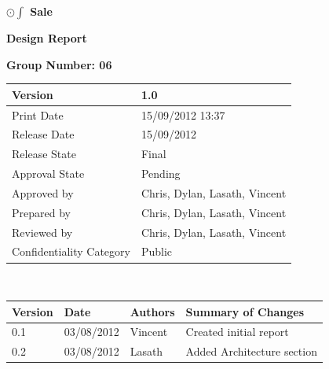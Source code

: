 \documentclass[a4paper]{article}
\begin{document}
\thispagestyle{empty}      %
\begin{center}
\Large\textbf{$\odot\int$ Sale} %

\Large\textbf{Design Report}

\bigskip\large\textbf{Group Number: 06}
\end{center}

\vspace*{16.5cm}
\begin{tabular}{|l|l|}
  \hline
  Version         & 1.0\\\hline
  Print Date      & 15/09/2012 13:37\\\hline
  Release Date    & 15/09/2012\\\hline
  Release State   & Final\\\hline
  Approval State  & Pending\\\hline
  Approved by     & Chris, Dylan, Lasath, Vincent\\\hline
  Prepared by     & Chris, Dylan, Lasath, Vincent\\\hline
  Reviewed by     & Chris, Dylan, Lasath, Vincent\\\hline
  Confidentiality Category  & Public\\\hline
\end{tabular}
\pagebreak

\thispagestyle{plain}     %
\setcounter{page}{1}      %
\renewcommand{\thepage}{\roman{page}}  %

\\[2ex]
\begin{tabular}{|l|l|l|l|}
  \hline
  Version & Date & Authors & Summary of Changes\\\hline\hline
  0.1 & 03/08/2012     &    Vincent     &    Created initial report               \\\hline
   0.2 & 03/08/2012     &    Lasath     &    Added Architecture section               \\\hline
 
\end{tabular}

\pagebreak

\end{document}
